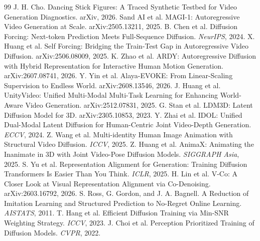 \documentclass[10pt,twocolumn]{article}
\begin{document}
\balance
\begin{thebibliography}{99}\small
{} J. H. Cho. Dancing Stick Figures: A Traced Synthetic Testbed for Video Generation
Diagnostics. arXiv, 2026. %
 Sand AI et al. MAGI-1: Autoregressive Video Generation at Scale. arXiv:2505.13211, 2025.
 B. Chen et al. Diffusion Forcing: Next-token Prediction Meets Full-Sequence Diffusion. \emph{NeurIPS}, 2024.
 X. Huang et al. Self Forcing: Bridging the Train-Test Gap in Autoregressive Video Diffusion. arXiv:2506.08009, 2025.
 K. Zhao et al. ARDY: Autoregressive Diffusion with Hybrid Representation for Interactive Human Motion Generation. arXiv:2607.08741, 2026.
 Y. Yin et al. Alaya-EVOKE: From Linear-Scaling Supervision to Endless World. arXiv:2608.13546, 2026.
 J. Huang et al. UnityVideo: Unified Multi-Modal Multi-Task Learning for Enhancing World-Aware Video Generation. arXiv:2512.07831, 2025.
 G. Stan et al. LDM3D: Latent Diffusion Model for 3D. arXiv:2305.10853, 2023.
 Y. Zhai et al. IDOL: Unified Dual-Modal Latent Diffusion for Human-Centric Joint Video-Depth Generation. \emph{ECCV}, 2024.
 Z. Wang et al. Multi-identity Human Image Animation with Structural Video Diffusion. \emph{ICCV}, 2025.
 Z. Huang et al. AnimaX: Animating the Inanimate in 3D with Joint Video-Pose Diffusion Models. \emph{SIGGRAPH Asia}, 2025.
 S. Yu et al. Representation Alignment for Generation: Training Diffusion Transformers Is Easier Than You Think. \emph{ICLR}, 2025.
 H. Lin et al. V-Co: A Closer Look at Visual Representation Alignment via Co-Denoising. arXiv:2603.16792, 2026.
 S. Ross, G. Gordon, and J. A. Bagnell. A Reduction of Imitation Learning and Structured Prediction to No-Regret Online Learning. \emph{AISTATS}, 2011.
 T. Hang et al. Efficient Diffusion Training via Min-SNR Weighting Strategy. \emph{ICCV}, 2023.
 J. Choi et al. Perception Prioritized Training of Diffusion Models. \emph{CVPR}, 2022.
\end{thebibliography}
\end{document}
